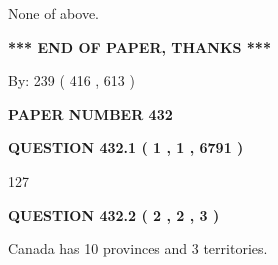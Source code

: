 \documentclass[12pt]{article}
\begin{document}
  
 
 
\noindent{}
 
 
 None of above.
 
 
 
 
   
   
 \vspace{0.2in}
 
   
   
   
   
\vspace{1.0in} 
{\textbf{\large{ *** END OF PAPER, THANKS *** }}} 
   
   
\hspace{1.0in} By: 
 239 ( 416 ,  613 )
   
   
   
   
\newpage 
\setcounter{page}{ 
   432001 } 
   
   
   
   
 {\textbf{ \Large{ PAPER NUMBER  432  }}}
   
   
\vspace{0.2in}
   
   
   
   
   
   
 \vspace{0.2in}
 
 
 
 
   
   
  
\vspace{0.2in}
  
{\textbf{\Large{QUESTION
432.1 
 ( 1 , 1 , 6791 )
}}}
  
  
 
 
\noindent{}

127
 
 
  
\vspace{0.2in}
  
{\textbf{\Large{QUESTION
432.2 
 ( 2 , 2 , 3 )
}}}
  
  
 
 
\noindent{}
 
 
Canada has 10  provinces and 3 territories.
 
\end{document}
